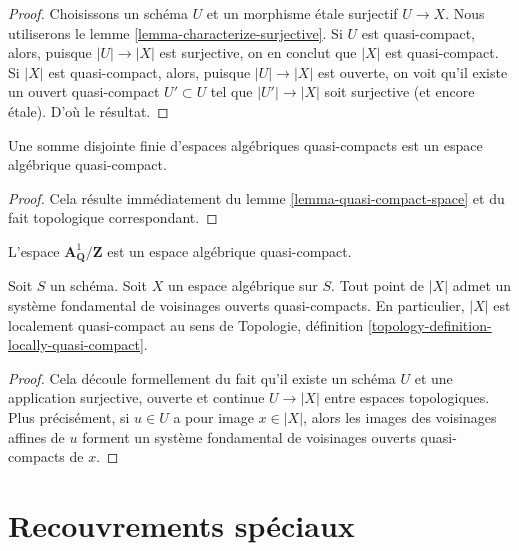 \begin{proof}
Choisissons un schéma $U$ et un morphisme étale surjectif $U \to X$.
Nous utiliserons le lemme \ref{lemma-characterize-surjective}.
Si $U$ est quasi-compact, alors, puisque $|U| \to |X|$ est surjective,
on en conclut que $|X|$ est quasi-compact.
Si $|X|$ est quasi-compact, alors, puisque $|U| \to |X|$ est ouverte,
on voit qu'il existe un ouvert quasi-compact $U' \subset U$
tel que $|U'| \to |X|$ soit surjective (et encore étale).
D'où le résultat.
\end{proof}

\begin{lemma}
\label{lemma-finite-disjoint-quasi-compact}
Une somme disjointe finie d'espaces algébriques quasi-compacts est
un espace algébrique quasi-compact.
\end{lemma}

\begin{proof}
Cela résulte immédiatement du
lemme \ref{lemma-quasi-compact-space}
et du fait topologique correspondant.
\end{proof}

\begin{example}
\label{example-quasi-compact-not-very-reasonable}
L'espace $\mathbf{A}^1_{\mathbf{Q}}/\mathbf{Z}$ est un espace algébrique
quasi-compact.
\end{example}

\begin{lemma}
\label{lemma-space-locally-quasi-compact}
Soit $S$ un schéma.
Soit $X$ un espace algébrique sur $S$.
Tout point de $|X|$ admet un système fondamental de voisinages
ouverts quasi-compacts.
En particulier, $|X|$ est localement quasi-compact au sens de
Topologie, définition \ref{topology-definition-locally-quasi-compact}.
\end{lemma}

\begin{proof}
Cela découle formellement du fait qu'il existe un schéma
$U$ et une application surjective, ouverte et continue
$U \to |X|$ entre espaces topologiques. Plus précisément, si
$u \in U$ a pour image $x \in |X|$, alors les images des voisinages
affines de $u$ forment un système fondamental de voisinages ouverts
quasi-compacts de $x$.
\end{proof}







\section{Recouvrements spéciaux}
\label{section-special-coverings}


